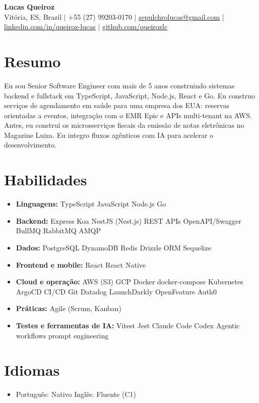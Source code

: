 \documentclass[letterpaper,10pt]{article}
\newcommand{\resumeItem}[1]{\item\small{#1}}
\newcommand{\resumeSubHeadingList}{\begin{itemize}[leftmargin=0.15in, label={}, nosep, beginpenalty=10000]}
\newcommand{\resumeSubHeadingListEnd}{\end{itemize}}
\begin{document}
\begin{center}
  \textbf{\Huge Lucas Queiroz} \\[3pt]
  \small Vit\'oria, ES, Brazil $|$ +55 (27) 99203-0170 $|$ \href{mailto:sepulchrolucas@gmail.com}{sepulchrolucas@gmail.com} $|$
  \href{https://linkedin.com/in/queiroz-lucas}{linkedin.com/in/queiroz-lucas} $|$
  \href{https://github.com/queirozlc}{github.com/queirozlc}
\end{center}
\vspace{2pt}

\section{Resumo}
Eu sou Senior Software Engineer com mais de 5 anos construindo sistemas backend e fullstack em TypeScript, JavaScript, Node.js, React e Go. Eu construo servi\c{c}os de agendamento em sa\'ude para uma empresa dos EUA: reservas orientadas a eventos, integra\c{c}\~ao com o EMR Epic e APIs multi-tenant na AWS. Antes, eu constru\'i os microsservi\c{c}os fiscais da emiss\~ao de notas eletr\^onicas no Magazine Luiza. Eu integro fluxos ag\^enticos com IA para acelerar o desenvolvimento.

\section{Habilidades}
\resumeSubHeadingList
\resumeItem{\textbf{Linguagens:} TypeScript \textbar{} JavaScript \textbar{} Node.js \textbar{} Go}
\resumeItem{\textbf{Backend:} Express \textbar{} Koa \textbar{} NestJS (Nest.js) \textbar{} REST APIs \textbar{} OpenAPI/Swagger \textbar{} BullMQ \textbar{} RabbitMQ \textbar{} AMQP}
\resumeItem{\textbf{Dados:} PostgreSQL \textbar{} DynamoDB \textbar{} Redis \textbar{} Drizzle ORM \textbar{} Sequelize}
\resumeItem{\textbf{Frontend e mobile:} React \textbar{} React Native}
\resumeItem{\textbf{Cloud e opera\c{c}\~ao:} AWS (S3) \textbar{} GCP \textbar{} Docker \textbar{} docker-compose \textbar{} Kubernetes \textbar{} ArgoCD \textbar{} CI/CD \textbar{} Git \textbar{} Datadog \textbar{} LaunchDarkly \textbar{} OpenFeature \textbar{} Auth0}
\resumeItem{\textbf{Pr\'aticas:} Agile (Scrum, Kanban)}
\resumeItem{\textbf{Testes e ferramentas de IA:} Vitest \textbar{} Jest \textbar{} Claude Code \textbar{} Codex \textbar{} Agentic workflows \textbar{} prompt engineering}\resumeSubHeadingListEnd

\section{Idiomas}
\resumeSubHeadingList
\resumeItem{Portugu\^es: Nativo \textbar{} Ingl\^es: Fluente (C1)}
\resumeSubHeadingListEnd
\end{document}
